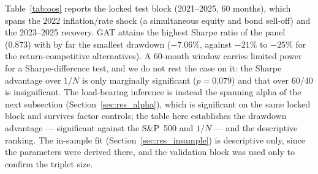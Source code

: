 Table~\ref{tab:oos} reports the locked test block (2021--2025, 60 months), which
spans the 2022 inflation/rate shock (a simultaneous equity and bond sell-off) and
the 2023--2025 recovery. GAT attains the highest Sharpe ratio of the panel (0.873)
with by far the smallest drawdown ($-7.06\%$, against $-21\%$ to $-25\%$ for the
return-competitive alternatives). A 60-month window carries limited power for a
Sharpe-difference test, and we do not rest the case on it: the Sharpe advantage over
$1/N$ is only marginally significant ($p = 0.079$) and that over 60/40 is
insignificant. The load-bearing inference is instead the spanning alpha of the next
subsection (Section~\ref{sec:res_alpha}), which is significant on the same locked
block and survives factor controls; the table here establishes the
drawdown advantage --- significant against the S\&P~500 and $1/N$ --- and the
descriptive ranking. The in-sample fit (Section~\ref{sec:res_insample}) is
descriptive only, since the parameters were derived there, and the validation block
was used only to confirm the triplet size.

